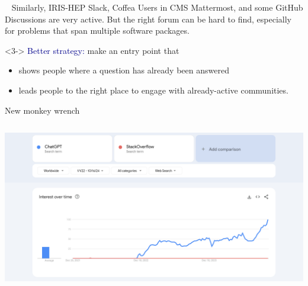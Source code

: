 \documentclass[aspectratio=169]{beamer}
\begin{document}
\begin{frame}{\mbox{ }}
\large
\vspace{0.5 cm}
Similarly, IRIS-HEP Slack, Coffea Users in CMS Mattermost, and some GitHub Discussions are very active. But the right forum can be hard to find, especially for problems that span multiple software packages.

\vspace{1 cm}

\vspace{1 cm}
\begin{uncoverenv}<3->
\textcolor{darkblue}{Better strategy:} make an entry point that

\vspace{0.25 cm}
\begin{itemize}
\item shows people where a question has already been answered
\item leads people to the right place to engage with already-active communities.
\end{itemize}
\end{uncoverenv}
\end{frame}

\begin{frame}{New monkey wrench}
\vspace{0.17 cm}
\begin{columns}
\includegraphics[width=\linewidth]{PLOTS/googletrends-chatgpt.png}
\end{columns}
\end{frame}
\end{document}
